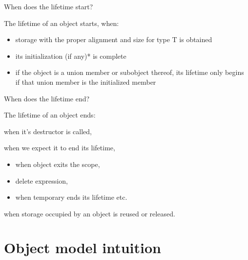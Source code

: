 \documentclass{panicsoftware-presentation}
\makeatletter
\newenvironment{itemizeSeq}{\begin{itemize}[<+-|alert@+>]}{\end{itemize}}
\makeatother
\begin{document}
\begin{frame}{When does the lifetime start?}

\centerline{The lifetime of an object \alert{starts}, when:}

\begin{itemizeSeq}

\item storage with the proper alignment and size for type T is obtained
\item its initialization (if any)* is complete
\item if the object is a union member or subobject thereof, its lifetime only begins if that union member is the initialized member

\end{itemizeSeq}


\end{frame}

\begin{frame}{When does the lifetime end?}

\centerline{The lifetime of an object \alert{ends}:}

\begin{description}[<+-|alert@+>]

\item[class types] when it's destructor is called,
\item[non-class types] when we expect it to end its lifetime, 
\begin{itemize}
	\item when object exits the scope,
	\item delete expression,
	\item when temporary ends its lifetime etc.
\end{itemize}
\item[any type] when storage occupied by an object is reused or released.
\end{description}

\end{frame}

\section{Object model intuition}
\end{document}
